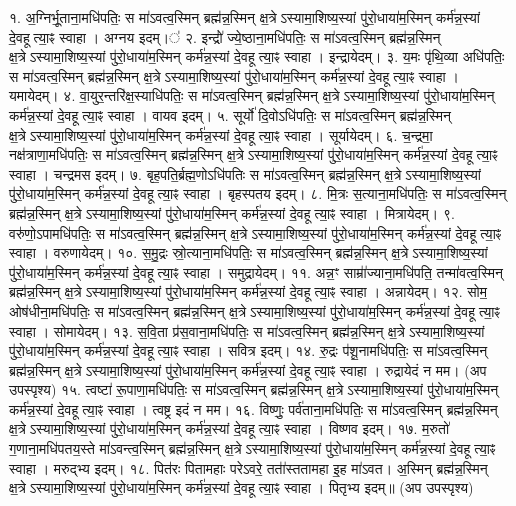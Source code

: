 १. अ॒ग्निर्भू॒ताना॒मधि॑पतिः॒ स मा॑ऽवत्व॒स्मिन् ब्रह्म॑न्न॒स्मिन् क्ष॒त्रेऽस्यामा॒शिष्य॒स्यां पु॑रो॒धाया॑म॒स्मिन् कर्म॑न्न॒स्यां दे॒वहूत्या॒ꣴ स्वाहा। अग्नय इदम्।॑
२. इन्द्रो॑॑ ज्ये॒ष्ठाना॒मधि॑पतिः॒ स मा॑ऽवत्व॒स्मिन् ब्रह्म॑न्न॒स्मिन् क्ष॒त्रेऽस्यामा॒शिष्य॒स्यां पु॑रो॒धाया॑म॒स्मिन् कर्म॑न्न॒स्यां दे॒वहूत्या॒ꣴ स्वाहा। इन्द्रायेदम्।
३. य॒मः पृ॑थि॒व्या अधि॑पतिः॒ स मा॑ऽवत्व॒स्मिन् ब्रह्म॑न्न॒स्मिन् क्ष॒त्रेऽस्यामा॒शिष्य॒स्यां पु॑रो॒धाया॑म॒स्मिन् कर्म॑न्न॒स्यां दे॒वहूत्या॒ꣴ स्वाहा। यमायेदम्।
४. वा॒युर॒न्तरि॑क्ष॒स्याधि॑पतिः॒ स मा॑ऽवत्व॒स्मिन् ब्रह्म॑न्न॒स्मिन् क्ष॒त्रेऽस्यामा॒शिष्य॒स्यां पु॑रो॒धाया॑म॒स्मिन् कर्म॑न्न॒स्यां दे॒वहूत्या॒ꣴ स्वाहा। वायव इदम्।
५. सूर्यो॑ दि॒वोऽधि॑पतिः॒ स मा॑ऽवत्व॒स्मिन् ब्रह्म॑न्न॒स्मिन् क्ष॒त्रेऽस्यामा॒शिष्य॒स्यां पु॑रो॒धाया॑म॒स्मिन् कर्म॑न्न॒स्यां दे॒वहूत्या॒ꣴ स्वाहा। सूर्यायेदम्।
६. च॒न्द्रमा॒ नक्ष॑त्राणा॒मधि॑पतिः॒ स मा॑ऽवत्व॒स्मिन् ब्रह्म॑न्न॒स्मिन् क्ष॒त्रेऽस्यामा॒शिष्य॒स्यां पु॑रो॒धाया॑म॒स्मिन् कर्म॑न्न॒स्यां दे॒वहूत्या॒ꣴ स्वाहा। चन्द्रमस इदम्।
७. बृह॒पति॒र्ब्रह्म॒णोऽधि॑पतिः स मा॑ऽवत्व॒स्मिन् ब्रह्म॑न्न॒स्मिन् क्ष॒त्रेऽस्यामा॒शिष्य॒स्यां पु॑रो॒धाया॑म॒स्मिन् कर्म॑न्न॒स्यां दे॒वहूत्या॒ꣴ स्वाहा। बृहस्पतय इदम्।
८. मि॒त्रः स॒त्याना॒मधि॑पतिः॒ स मा॑ऽवत्व॒स्मिन् ब्रह्म॑न्न॒स्मिन् क्ष॒त्रेऽस्यामा॒शिष्य॒स्यां पु॑रो॒धाया॑म॒स्मिन् कर्म॑न्न॒स्यां दे॒वहूत्या॒ꣴ स्वाहा। मित्रायेदम्।
९. वरु॑णो॒ऽपामधि॑पतिः॒ स मा॑ऽवत्व॒स्मिन् ब्रह्म॑न्न॒स्मिन् क्ष॒त्रेऽस्यामा॒शिष्य॒स्यां पु॑रो॒धाया॑म॒स्मिन् कर्म॑न्न॒स्यां दे॒वहूत्या॒ꣴ स्वाहा। वरुणायेदम्।
१०. स॒मु॒द्रः स्रो॒त्याना॒मधि॑पतिः॒ स मा॑ऽवत्व॒स्मिन् ब्रह्म॑न्न॒स्मिन् क्ष॒त्रेऽस्यामा॒शिष्य॒स्यां पु॑रो॒धाया॑म॒स्मिन् कर्म॑न्न॒स्यां दे॒वहूत्या॒ꣴ स्वाहा। समुद्रायेदम्।
११. अन्न॒ꣳ साम्रा॑॑ज्याना॒मधि॑पति॒ तन्मा॑वत्व॒स्मिन् ब्रह्म॑न्न॒स्मिन् क्ष॒त्रेऽस्यामा॒शिष्य॒स्यां पु॑रो॒धाया॑म॒स्मिन् कर्म॑न्न॒स्यां दे॒वहूत्या॒ꣴ स्वाहा। अन्नायेदम्।
१२. सोम॒ ओष॑धीना॒मधि॑पतिः॒ स मा॑ऽवत्व॒स्मिन् ब्रह्म॑न्न॒स्मिन् क्ष॒त्रेऽस्यामा॒शिष्य॒स्यां पु॑रो॒धाया॑म॒स्मिन् कर्म॑न्न॒स्यां दे॒वहूत्या॒ꣴ स्वाहा। सोमायेदम्।
१३. स॒वि॒ता प्र॑स॒वाना॒मधि॑पतिः॒ स मा॑ऽवत्व॒स्मिन् ब्रह्म॑न्न॒स्मिन् क्ष॒त्रेऽस्यामा॒शिष्य॒स्यां पु॑रो॒धाया॑म॒स्मिन् कर्म॑न्न॒स्यां दे॒वहूत्या॒ꣴ स्वाहा। सवित्र इदम्।
१४. रु॒द्रः प॑शू॒नामधि॑पतिः॒ स मा॑ऽवत्व॒स्मिन् ब्रह्म॑न्न॒स्मिन् क्ष॒त्रेऽस्यामा॒शिष्य॒स्यां पु॑रो॒धाया॑म॒स्मिन् कर्म॑न्न॒स्यां दे॒वहूत्या॒ꣴ स्वाहा। रुद्रायेदं न मम। (अप उपस्पृश्य)
१५. त्वष्टा॑ रू॒पाणा॒मधि॑पतिः॒ स मा॑ऽवत्व॒स्मिन् ब्रह्म॑न्न॒स्मिन् क्ष॒त्रेऽस्यामा॒शिष्य॒स्यां पु॑रो॒धाया॑म॒स्मिन् कर्म॑न्न॒स्यां दे॒वहूत्या॒ꣴ स्वाहा। त्वष्ट्र इदं न मम।
१६. विष्णुः॒ पर्व॑ताना॒मधि॑पतिः॒ स मा॑ऽवत्व॒स्मिन् ब्रह्म॑न्न॒स्मिन् क्ष॒त्रेऽस्यामा॒शिष्य॒स्यां पु॑रो॒धाया॑म॒स्मिन् कर्म॑न्न॒स्यां दे॒वहूत्या॒ꣴ स्वाहा। विष्णव इदम्।
१७. म॒रुतो॑ ग॒णाना॒मधि॑पतय॒स्ते मा॑ऽवन्त्व॒स्मिन् ब्रह्म॑न्न॒स्मिन् क्ष॒त्रेऽस्यामा॒शिष्य॒स्यां पु॑रो॒धाया॑म॒स्मिन् कर्म॑न्न॒स्यां दे॒वहूत्या॒ꣴ स्वाहा। मरुद्भ्य इदम्।
१८. पित॑रः पितामहाः परेऽवरे॒ तता॑॑स्ततामहा इ॒ह मा॑ऽवत। अ॒स्मिन् ब्रह्म॑न्न॒स्मिन् क्ष॒त्रेऽस्यामा॒शिष्य॒स्यां पु॑रो॒धाया॑म॒स्मिन् कर्म॑न्न॒स्यां दे॒वहूत्या॒ꣴ स्वाहा। पितृभ्य इदम्॥ (अप उपस्पृश्य)

